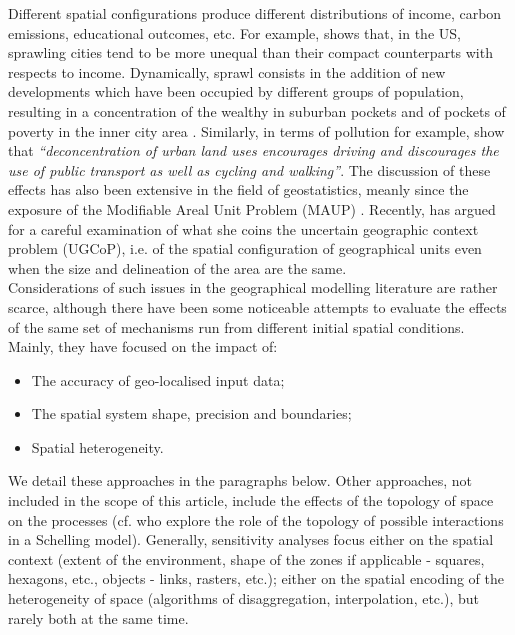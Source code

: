 \documentclass[Royal,sageh,times]{sagej}
\begin{document}
Different spatial configurations produce different distributions of income, carbon emissions, educational outcomes, etc. For example, \citet{wheeler2006urban} shows that, in the US, sprawling cities tend to be more unequal than their compact counterparts with respects to income. Dynamically, sprawl consists in the addition of new developments which have been occupied by different groups of population, resulting in a concentration of the wealthy in suburban pockets and of pockets of poverty in the inner city area \citep{jargowsky2002sprawl}. Similarly, in terms of pollution for example, \citet[p.173]{schwanen2001travel} show that \textit{``deconcentration of urban land uses encourages driving and discourages the use of public transport as well as cycling and walking''}. The discussion of these effects has also been extensive in the field of geostatistics, meanly since the exposure of the Modifiable Areal Unit Problem (MAUP) \citep{Openshaw1984, FotheringhamWong1991}. Recently, \citet{Kwan2012} has argued for a careful examination of what she coins the uncertain geographic context problem (UGCoP), i.e. of the spatial configuration of geographical units even when the size and delineation of the area are the same.\\

Considerations of such issues in the geographical modelling literature are rather scarce, although there have been some noticeable attempts to evaluate the effects of the same set of mechanisms run from different initial spatial conditions. Mainly, they have focused on the impact of:
\begin{itemize}
\item The accuracy of geo-localised input data;
\item The spatial system shape, precision and boundaries;
\item Spatial heterogeneity.
\end{itemize}
We detail these approaches in the paragraphs below. Other approaches, not included in the scope of this article, include the effects of the topology of space on the processes (cf. \citet{moreno2009integrating} who explore the role of the topology of possible interactions in a Schelling model). Generally, sensitivity analyses focus either on the spatial context (extent of the environment, shape of the zones if applicable - squares, hexagons, etc., objects - links, rasters, etc.); either on the spatial encoding of the heterogeneity of space (algorithms of disaggregation, interpolation, etc.), but rarely both at the same time.
\end{document}
